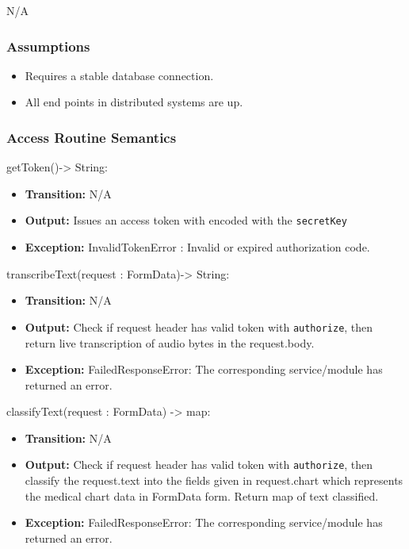 \documentclass[12pt, titlepage]{article}
\begin{document}
N/A

\subsubsection{Assumptions}

\begin{itemize}
  \item Requires a stable database connection.
  \item All end points in distributed systems are up.
\end{itemize}

\subsubsection{Access Routine Semantics}

\noindent getToken()-> String:
\begin{itemize}
    \item \textbf{Transition:} N/A
    \item \textbf{Output:} Issues an access token with encoded with the \texttt{secretKey}
    \item \textbf{Exception:} InvalidTokenError : Invalid or expired authorization code.
\end{itemize}

\noindent transcribeText(request : FormData)-> String:
\begin{itemize}
    \item \textbf{Transition:} N/A
    \item \textbf{Output:} Check if request header has valid token with \texttt{authorize}, then return live transcription of audio bytes in the request.body.
    \item \textbf{Exception:} FailedResponseError: The corresponding service/module has returned an error.
\end{itemize}

\noindent classifyText(request : FormData) -> map:
\begin{itemize}
    \item \textbf{Transition:} N/A
    \item \textbf{Output:} Check if request header has valid token with \texttt{authorize}, then classify the request.text into the fields given in request.chart which represents the medical chart data in FormData form. Return map of text classified. 
    \item \textbf{Exception:} FailedResponseError: The corresponding service/module has returned an error.
\end{itemize}
\end{document}
